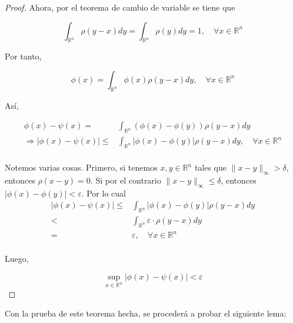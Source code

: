 \documentclass[12pt]{report}
\theoremstyle{largebreak}
\newcommand\abs[1]{\ensuremath{\lvert#1\rvert}}
\begin{document}
\begin{proof}
    Ahora, por el teorema de cambio de variable se tiene que
    
    \begin{equation*}
        \int_{\mathbb{R}^n}\rho(y-x)dy=\int_{\mathbb{R}^n}\rho(y)dy=1,\quad\forall x\in\mathbb{R}^n
    \end{equation*}

    Por tanto,

    \begin{equation*}
        \phi(x)=\int_{\mathbb{R}^n}\phi(x)\rho(y-x)dy,\quad \forall x\in\mathbb{R}^n
    \end{equation*}

    Así,

    \begin{equation*}
        \begin{split}
            \phi(x)-\psi(x)=&\int_{\mathbb{R}^n}\left(\phi(x)-\phi(y)\right)\rho(y-x)dy\\
            \Rightarrow \abs{\phi(x)-\psi(x)}\leq&\int_{\mathbb{R}^n}\abs{\phi(x)-\phi(y)}\rho(y-x)dy,\quad \forall x\in\mathbb{R}^n\\
        \end{split}
    \end{equation*}
    
    Notemos varias cosas. Primero, si tenemos $x,y\in\mathbb{R}^n$ tales que $\|x-y\|_\infty>\delta$, entonces $\rho(x-y)=0$. Si por el contrario $\|x-y\|_\infty\leq\delta$, entonces $\abs{\phi(x)-\phi(y)}<\varepsilon$. Por lo cual
    \begin{equation*}
        \begin{split}
            \abs{\phi(x)-\psi(x)}\leq&\int_{\mathbb{R}^n}\abs{\phi(x)-\phi(y)}\rho(y-x)dy\\
            <&\int_{\mathbb{R}^n}\varepsilon\cdot\rho(y-x)dy\\
            =&\varepsilon,\quad\forall x\in\mathbb{R}^n\\
        \end{split}
    \end{equation*}
    
    Luego,
    
    \begin{equation*}
        \sup_{x\in\mathbb{R}^n}\abs{\phi(x)-\psi(x)}<\varepsilon
    \end{equation*}

    \end{proof}

Con la prueba de este teorema hecha, se procederá a probar el siguiente lema:
\end{document}
